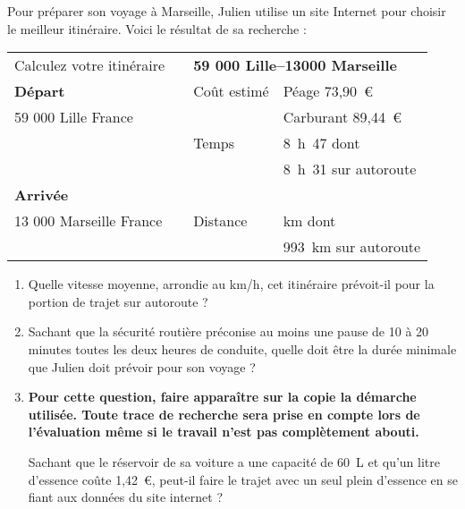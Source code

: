 
\medskip
 
Pour préparer son voyage à Marseille, Julien utilise un site Internet pour choisir le meilleur itinéraire. Voici le résultat de sa recherche : 

\begin{center}
\begin{tabularx}{\linewidth}{|l|m{1cm}|l X|}\hline
Calculez votre itinéraire	&	&\multicolumn{2}{|l|}{\textbf{59 000 Lille--13000 Marseille}}\\
\textbf{Départ}				&	&Coût estimé&Péage 73,90~\euro\\
59 000 Lille  France		&	&			&Carburant 89,44~\euro\\
							&	&Temps		&8~h~47 dont\\
							&	&			&8~h~31 sur autoroute\\
\textbf{Arrivée}			&	&			&\\
13 000 Marseille France		&	&Distance	&\np{1004} km dont\\
							&	&			&993~km sur autoroute\\ \hline
\end{tabularx}
\end{center}

\begin{enumerate}
\item Quelle vitesse moyenne, arrondie au km/h, cet itinéraire prévoit-il pour la portion de trajet sur autoroute ? 
\item Sachant que la sécurité routière préconise au moins une pause de 10 à 20 minutes toutes les deux heures de conduite, quelle doit être la durée minimale que Julien doit prévoir pour son voyage ? 

\medskip

 
\item \textbf{Pour cette question, faire apparaître sur la copie la démarche utilisée. Toute trace de recherche sera prise en compte lors de l'évaluation même si le travail n'est pas complètement abouti.}

Sachant que le réservoir de sa voiture a une capacité de 60~L et qu'un litre d'essence coûte 1,42~\euro, peut-il faire le trajet avec un seul plein d'essence en se fiant aux données du site internet ?
\end{enumerate}
 
\vspace{0,5cm}

